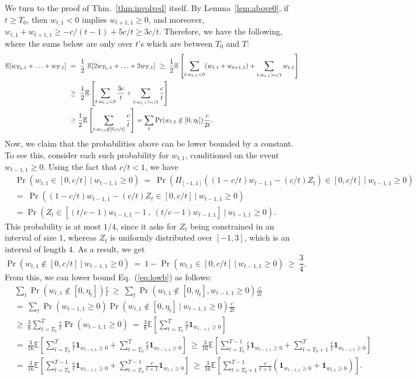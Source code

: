 \documentclass{article}
\newcommand{\E}{\mathbb{E}}
\renewcommand{\eqref}[1]{Eq.~(\ref{#1})}
\newcommand{\lemref}[1]{Lemma~\ref{#1}}
\newcommand{\thmref}[1]{Thm.~\ref{#1}}
\begin{document}
We turn to the proof of \thmref{thm:involved} itself. By \lemref{lem:above0}, if $t\geq T_0$, then $w_{t,1}<0$ implies $w_{t+1,1}\geq 0$, and moreover, $w_{t,1}+w_{t+1,1} \geq -c/(t-1)+5c/t\geq 3c/t$. Therefore, we have the following, where the sums below are only over $t$'s which are between $T_0$ and $T$:
\begin{align}
\E[w_{T_0,1}+\ldots+w_{T,1}] ~&=~ \frac{1}{2}~\E[2w_{T_0,1}+\ldots+2w_{T,1}]
~\geq~ \frac{1}{2}\E\left[\sum_{t:w_{t,1}<0}(w_{t,1}+w_{t+1,1})+\sum_{t:w_{t,1}>c/t}w_{t,1} \right]\notag\\
&\geq~ \frac{1}{2}\E\left[\sum_{t:w_{t,1}<0}\frac{3c}{t}+\sum_{t:w_{t,1}> c/t} \frac{c}{t}\right]\notag\\
&\geq \frac{1}{2}\E\left[\sum_{t:w_{t,1}\notin [0,c/t]}\frac{c}{t}\right] = \sum_{t}\Pr(w_{t,1}\notin[0,\eta_t])\frac{c}{2t}.\label{eq:lowb}
\end{align}
Now, we claim that the probabilities above can be lower bounded by a constant. To see this, consider each such probability for $w_{t,1}$, conditioned on the event $w_{t-1,1}\geq 0$. Using the fact that $c/t< 1$, we have
\begin{align*}
&\Pr(w_{t,1}\in \left[0,c/t\right]~|~w_{t-1,1}\geq 0) ~=~\Pr\left(\Pi_{[-1,1]}\left(\left(1-c/t\right)w_{t-1,1}-(c/t)
Z_t\right) \in \left[0,c/t\right]~|~w_{t-1,1}\geq 0\right)\\
&=~\Pr\left(\left(1-c/t\right)w_{t-1,1}-(c/t) Z_t \in \left[0,c/t\right]~|~w_{t-1,1}\geq 0\right)\\
&= \Pr\left(Z_t \in \left[\left(t/c-1\right)w_{t-1,1}-1~,~
\left(t/c-1\right)w_{t-1,1}\right] ~|~ w_{t-1,1}\geq 0\right).
\end{align*}
This probability is at most $1/4$, since it asks for $Z_t$ being constrained in an interval of size $1$, whereas $Z_t$ is uniformly distributed over $[-1,3]$, which is an interval of length $4$. As a result, we get
\[
\Pr(w_{t,1}\notin[0,c/t]~|~w_{t-1,1}\geq 0) ~=~ 1-\Pr(w_{t,1}\in [0,c/t]~|~w_{t-1,1}\geq 0) ~\geq~ \frac{3}{4}.
\]
From this, we can lower bound \eqref{eq:lowb} as follows:
\begin{align*}
&\sum_{t}\Pr(w_{t,1}\notin[0,\eta_t])\frac{c}{t} ~\geq~
\sum_{t}\Pr(w_{t,1}\notin[0,\eta_t],w_{t-1,1}\geq 0)\frac{c}{2t}\\
&=~ \sum_{t}\Pr(w_{t-1,1}\geq 0) \Pr(w_{t,1}\notin[0,\eta_t]~|~ w_{t-1,1}\geq 0)\frac{c}{2t}\\
&\geq~
\frac{3}{8} \sum_{t=T_0}^{T} \frac{c}{t}\Pr(w_{t-1,1}\geq 0)
~=~ \frac{3}{8}\E\left[\sum_{t=T_0}^{T}\frac{c}{t}\mathbf{1}_{w_{t-1,1}\geq 0}\right]\\
&=~ \frac{3}{16}\E\left[\sum_{t=T_0}^{T}\frac{c}{t}\mathbf{1}_{w_{t-1,1}\geq 0}+\sum_{t=T_0}^{T}\frac{c}{t}\mathbf{1}_{w_{t-1,1}\geq 0}\right]
~\geq~ \frac{3}{16}\E\left[\sum_{t=T_0}^{T-1}\frac{c}{t}\mathbf{1}_{w_{t-1,1}\geq 0}+\sum_{t=T_0+1}^{T}\frac{c}{t}\mathbf{1}_{w_{t-1,1}\geq 0}\right]\\
&=~ \frac{3}{16}\E\left[\sum_{t=T_0}^{T-1}\frac{c}{t}\mathbf{1}_{w_{t-1,1}\geq 0}+\sum_{t=T_0}^{T-1}\frac{c}{t+1}\mathbf{1}_{w_{t,1}\geq 0}\right]
~\geq~ \frac{3}{16}\E\left[\sum_{t=T_0+1}^{T-1}\frac{c}{t+1}\left(\mathbf{1}_{w_{t-1,1}\geq 0}+
\mathbf{1}_{w_{t,1}\geq 0}\right)\right].
\end{align*}
\end{document}
